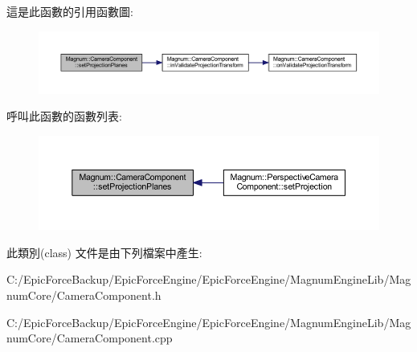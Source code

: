 這是此函數的引用函數圖\+:\nopagebreak
\begin{figure}[H]
\begin{center}
\leavevmode
\includegraphics[width=350pt]{class_magnum_1_1_camera_component_ab50fcc345c5beb14317b4bb74f6c2b2e_cgraph}
\end{center}
\end{figure}




呼叫此函數的函數列表\+:\nopagebreak
\begin{figure}[H]
\begin{center}
\leavevmode
\includegraphics[width=350pt]{class_magnum_1_1_camera_component_ab50fcc345c5beb14317b4bb74f6c2b2e_icgraph}
\end{center}
\end{figure}




此類別(class) 文件是由下列檔案中產生\+:\begin{DoxyCompactItemize}
\item 
C\+:/\+Epic\+Force\+Backup/\+Epic\+Force\+Engine/\+Epic\+Force\+Engine/\+Magnum\+Engine\+Lib/\+Magnum\+Core/Camera\+Component.\+h\item 
C\+:/\+Epic\+Force\+Backup/\+Epic\+Force\+Engine/\+Epic\+Force\+Engine/\+Magnum\+Engine\+Lib/\+Magnum\+Core/Camera\+Component.\+cpp\end{DoxyCompactItemize}
